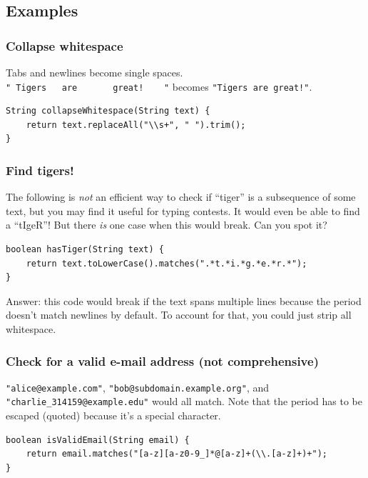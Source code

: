 \documentclass[a4paper,12pt]{article}
\begin{document}
\subsection{Examples}

\subsubsection{Collapse whitespace}
Tabs and newlines become single spaces. \\\verb/" Tigers   are       great!    "/ becomes \verb/"Tigers are great!"/.
\begin{lstlisting}
String collapseWhitespace(String text) {
	return text.replaceAll("\\s+", " ").trim();
}
\end{lstlisting}

\subsubsection{Find tigers!}
The following is {\em not} an efficient way to check if ``tiger'' is a subsequence of some text, but you may find it useful for typing contests. It would even be able to find a ``tIgeR''! But there {\em is} one case when this would break. Can you spot it?
\begin{lstlisting}
boolean hasTiger(String text) {
	return text.toLowerCase().matches(".*t.*i.*g.*e.*r.*");
}
\end{lstlisting}
\noindent Answer: this code would break if the text spans multiple lines because the period doesn't match newlines by default. To account for that, you could just strip all whitespace.

\subsubsection{Check for a valid e-mail address (not comprehensive)}
\verb/"alice@example.com"/, \verb/"bob@subdomain.example.org"/, and \verb/"charlie_314159@example.edu"/ would all match. Note that the period has to be escaped (quoted) because it's a special character.
\begin{lstlisting}
boolean isValidEmail(String email) {
	return email.matches("[a-z][a-z0-9_]*@[a-z]+(\\.[a-z]+)+");
}
\end{lstlisting}
\end{document}
